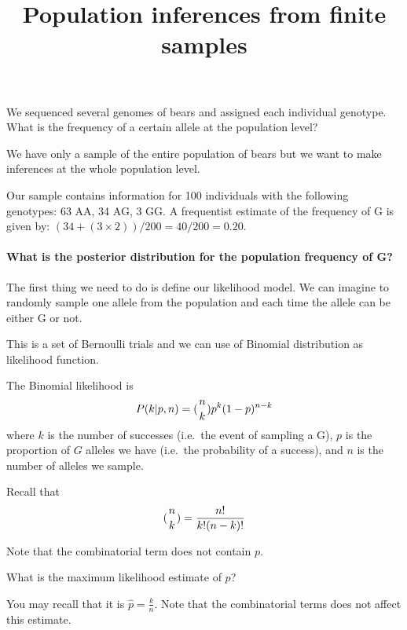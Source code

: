 \documentclass[
]{article}
\title{Population inferences from finite samples}
\author{}
\date{\vspace{-2.5em}}
\makeatletter
\newcommand*\pandocbounded[1]{%
  \sbox\pandoc@box{#1}%
  \Gscale@div\@tempa{\textheight}{\dimexpr\ht\pandoc@box+\dp\pandoc@box\relax}%
  \Gscale@div\@tempb{\linewidth}{\wd\pandoc@box}%
  \ifdim\@tempb\p@<\@tempa\p@\let\@tempa\@tempb\fi%
  \ifdim\@tempa\p@<\p@\scalebox{\@tempa}{\usebox\pandoc@box}%
  \else\usebox{\pandoc@box}%
  \fi%
}
\makeatother
\begin{document}
\maketitle

We sequenced several genomes of bears and assigned each individual
genotype. What is the frequency of a certain allele at the population
level?

\pandocbounded{\texttt{[image: Images/BrownBear.jpg]}}

We have only a sample of the entire population of bears but we want to
make inferences at the whole population level.

Our sample contains information for 100 individuals with the following
genotypes: 63 AA, 34 AG, 3 GG. A frequentist estimate of the frequency
of G is given by: \((34+(3\times2))/200=40/200=0.20\).

\paragraph{What is the posterior distribution for the population
frequency of
G?}\label{what-is-the-posterior-distribution-for-the-population-frequency-of-g}

The first thing we need to do is define our likelihood model. We can
imagine to randomly sample one allele from the population and each time
the allele can be either G or not.

This is a set of Bernoulli trials and we can use of Binomial
distribution as likelihood function.

The Binomial likelihood is \begin{equation}
     P(k|p,n) = ( \genfrac{}{}{0pt}{}{n}{k} ) p^k(1-p)^{n-k}
\end{equation} where \(k\) is the number of successes (i.e.~the event of
sampling a G), \(p\) is the proportion of \(G\) alleles we have
(i.e.~the probability of a success), and \(n\) is the number of alleles
we sample.

Recall that \begin{equation}
    (\genfrac{}{}{0pt}{}{n}{k}) = \frac{n!}{k!(n-k)!}
\end{equation}

Note that the combinatorial term does not contain \(p\).

What is the maximum likelihood estimate of \(p\)?

You may recall that it is \(\hat{p}=\frac{k}{n}\). Note that the
combinatorial terms does not affect this estimate.
\end{document}
